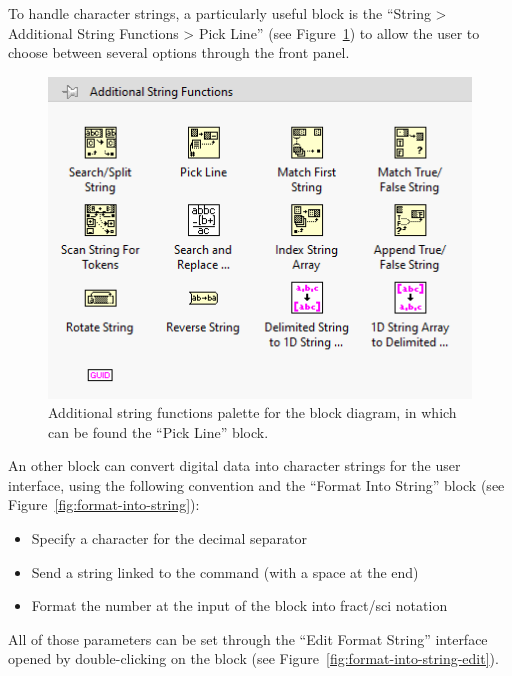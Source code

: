\documentclass{labo}
\begin{document}
To handle character strings, a particularly useful block is the “String > Additional String Functions > Pick Line” (see Figure~\ref{fig:palette-string}) to allow the user to choose between several options through the front panel.\\

\begin{figure}[ht!]
\centering
\includegraphics[scale=0.8]{functions-palette-additional-string.png}
\caption{Additional string functions palette for the block diagram, in which can be found the “Pick Line” block.}
\label{fig:palette-string}
\end{figure}

An other block can convert digital data into character strings for the user interface, using the following convention and the “Format Into String” block (see Figure~\vref{fig:format-into-string}):
\begin{itemize}
  \item Specify a character for the decimal separator
  \item Send a string linked to the command (with a space at the end)
  \item Format the number at the input of the block into fract/sci notation
\end{itemize}
All of those parameters can be set through the “Edit Format String” interface opened by double-clicking on the block (see Figure~\vref{fig:format-into-string-edit}).
\end{document}
